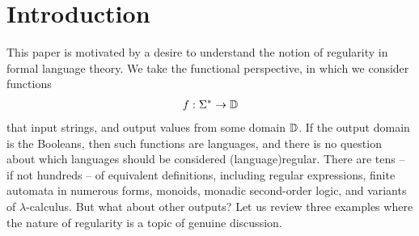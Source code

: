 \section{Introduction}
\label{sec:introduction}

\AP
This paper is motivated by a desire to understand the notion of  regularity in formal language theory. We take the functional perspective, in which we consider functions 
\begin{align*}
f : \Sigma^* \to \mathbb D
\end{align*}
that input strings, and output values from some domain $\mathbb D$. If the output
domain is the Booleans, then such functions are languages, and there is no
question about which languages should be considered \intro(language){regular}. There are tens --
if not hundreds -- of equivalent definitions, including regular expressions,
finite automata in numerous forms, monoids, monadic second-order logic, and
variants of $\lambda$-calculus. But what about other outputs? Let us review
three examples where the nature of regularity is a topic of genuine
discussion.

